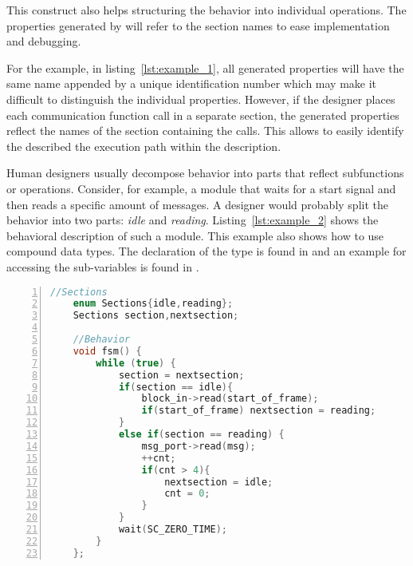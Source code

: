 This construct also helps 
structuring the behavior into individual operations. %
The properties generated by \DeSCAM{} will refer to the section names to
ease implementation and debugging. %

For the example, in listing~\ref{lst:example_1}, all generated
properties will have the same name appended by a unique identification
number which may make it difficult to distinguish the individual
properties.
However, if the designer places each communication function call in a
separate section, the generated properties reflect the names of the
section containing the calls. %
This allows to easily identify the described the execution path within
the \SYSTEMCPPA{} description. %

Human designers usually decompose behavior into parts that reflect
subfunctions or operations. %
Consider, for example, a module that waits for a start signal and then
reads a specific amount of messages. %
A designer would probably split the behavior into two parts: %
\textit{idle} and \textit{reading}. %
Listing~\ref{lst:example_2} shows the behavioral description of such a
module. %
This example also shows how to use compound data types. %
The declaration of the type is found in  and
an example for accessing the sub-variables is found in
. %

\begin{lstlisting}[language=C++,
caption={Example2},
label={lst:example_2},
numbers=left,
captionpos=b,   
basicstyle={\footnotesize},
xleftmargin=5.0ex]
    //Sections
    enum Sections{idle,reading};
    Sections section,nextsection;

    //Behavior
    void fsm() {
        while (true) {
            section = nextsection;
            if(section == idle){
                block_in->read(start_of_frame);
                if(start_of_frame) nextsection = reading;
            }
            else if(section == reading) {
                msg_port->read(msg);
                ++cnt;
                if(cnt > 4){
                    nextsection = idle;
                    cnt = 0;
                }
            }
            wait(SC_ZERO_TIME);
        }
    };
\end{lstlisting}


